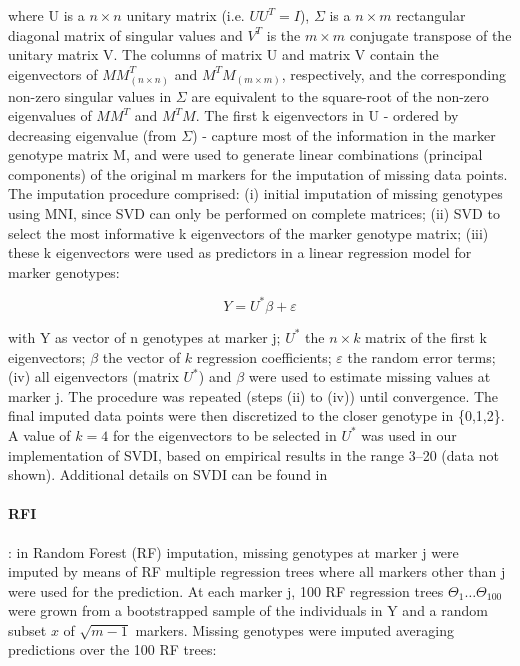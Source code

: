 where U is a $n \times n$ unitary matrix (i.e. $UU^{T}=I$), $\Sigma$ is a $n \times m$ rectangular diagonal matrix of singular values and $V^{T}$ is the $m \times m$ conjugate transpose of the unitary matrix V. The columns of matrix U and matrix V contain the eigenvectors of $MM^{T}_{(n \times n)}$ and $M^{T}M_{(m \times m)}$, respectively, and the corresponding non-zero singular values in $\Sigma$ are equivalent to the square-root of the non-zero eigenvalues of $MM^{T}$ and $M^{T}M$. The first k eigenvectors in U - ordered by decreasing eigenvalue (from $\Sigma$) - capture most of the information in the marker genotype matrix M, and were used to generate linear combinations (principal components) of the original m markers for the imputation of missing data points. The imputation procedure comprised: (i) initial imputation of missing genotypes using MNI, since SVD can only be performed on complete matrices; (ii) SVD to select the most informative k eigenvectors of the marker genotype matrix; (iii) these k eigenvectors were used as predictors in a linear regression model for marker genotypes:

\begin{equation}
\label{eq:SVDI_regression}
Y = U^*\beta +\varepsilon 
\end{equation}

with Y as vector of n genotypes at marker j; $U^*$ the $n \times k$ matrix of the first k eigenvectors; $\beta$ the vector of $k$ regression coefficients; $\varepsilon$ the random error terms; (iv) all eigenvectors (matrix $U^*$) and $\beta$ were used to estimate missing values at marker j. The procedure was repeated (steps (ii) to (iv)) until convergence. The final imputed data points were then discretized to the closer genotype in \{0,1,2\}. A value of $k=4$ for the eigenvectors to be selected in $U^*$ was used in our implementation of SVDI, based on empirical results in the range 3--20 (data not shown). Additional details on SVDI can be found in \cite{troyanskaya_missing_2001}

\paragraph{RFI}
\label{par:RFI}
: in Random Forest (RF) imputation, missing genotypes at marker j were imputed by means of RF multiple regression trees \cite{breiman_random_2001} where all markers other than j were used for the prediction. At each marker j, 100 RF regression trees $\Theta_{1} \ldots \Theta_{100}$ were grown from a bootstrapped sample of the individuals in Y and a random subset $x$ of $\sqrt{m-1}$ markers. Missing genotypes were imputed averaging predictions over the 100 RF trees:


